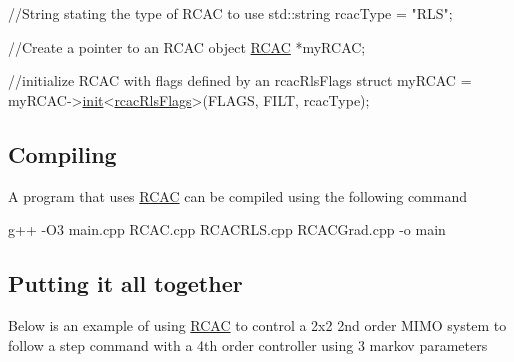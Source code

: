 \begin{DoxyCode}
\textcolor{comment}{//String stating the type of RCAC to use}
std::string rcacType = \textcolor{stringliteral}{"RLS"};

\textcolor{comment}{//Create a pointer to an RCAC object}
\hyperlink{class_r_c_a_c}{RCAC} *myRCAC;

\textcolor{comment}{//initialize RCAC with flags defined by an rcacRlsFlags struct}
myRCAC = myRCAC->\hyperlink{class_r_c_a_c_af7b7133b676886d5010be725291c1a1d}{init}<\hyperlink{structrcac_rls_flags}{rcacRlsFlags}>(FLAGS, FILT, rcacType);
\end{DoxyCode}


\subsection*{Compiling }

A program that uses \hyperlink{class_r_c_a_c}{R\+C\+AC} can be compiled using the following command 
\begin{DoxyCode}
g++ -O3 main.cpp RCAC.cpp RCACRLS.cpp RCACGrad.cpp -o main
\end{DoxyCode}


\subsection*{Putting it all together }

Below is an example of using \hyperlink{class_r_c_a_c}{R\+C\+AC} to control a 2x2 2nd order M\+I\+MO system to follow a step command with a 4th order controller using 3 markov parameters


